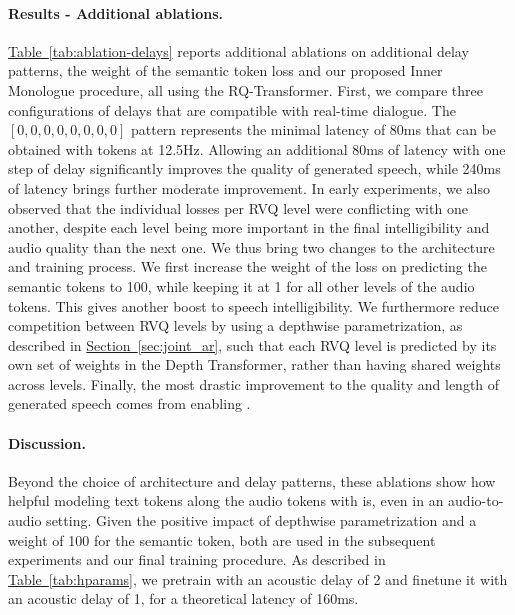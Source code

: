 \paragraph{Results - Additional ablations.} \hyperref[tab:ablation-delays]{Table~\ref{tab:ablation-delays}} reports additional ablations on additional delay patterns, the weight of the semantic token loss and our proposed Inner Monologue procedure, all using the RQ-Transformer. 
First, we compare three configurations of delays that are compatible with real-time dialogue. The $[0, 0, 0, 0, 0, 0, 0, 0]$ pattern represents the minimal latency of 80ms that can be obtained with \mimi{} tokens at 12.5Hz. Allowing an additional 80ms of latency with one step of delay significantly improves the quality of generated speech, while 240ms of latency brings further moderate improvement. 
In early experiments, we also observed that the individual losses per RVQ level were conflicting with one another, despite each level being more important in the final intelligibility and audio quality than the next one. We thus bring two changes to the architecture and training process. We first increase the weight of the loss on predicting the semantic tokens to 100, while keeping it at 1 for all other levels of the audio tokens. 
This gives another boost to speech intelligibility. We furthermore reduce competition between RVQ levels by using a depthwise parametrization, as described in \hyperref[sec:joint_ar]{Section~\ref{sec:joint_ar}}, such that each RVQ level is predicted by its own set of weights in the Depth Transformer, rather than having shared weights across levels.
Finally, the most drastic improvement to the quality and length of generated speech comes from enabling \interleaving{}.

\paragraph{Discussion.} Beyond the choice of architecture and delay patterns, these ablations show how helpful modeling text tokens along the audio tokens with \interleaving{} is, even in an audio-to-audio setting. Given the positive impact of depthwise parametrization and a weight of 100 for the semantic token, both are used in the subsequent experiments and our final training procedure. As described in \hyperref[tab:hparams]{Table~\ref{tab:hparams}}, we pretrain \ours{} with an acoustic delay of 2 and finetune it with an acoustic delay of 1, for a theoretical latency of 160ms.

